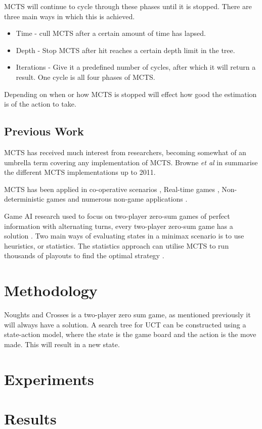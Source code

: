 MCTS will continue to cycle through these phases until it is stopped. There are three main ways in which this is achieved.
\begin{itemize}
  \item Time - cull MCTS after a certain amount of time has lapsed.
  \item Depth - Stop MCTS after hit reaches a certain depth limit in the tree.
  \item Iterations - Give it a predefined number of cycles, after which it will return a result. One cycle is all four phases of MCTS.
\end{itemize}

Depending on when or how MCTS is stopped will effect how good the estimation is of the action to take.

\subsection{Previous Work}
MCTS has received much interest from researchers, becoming somewhat of an umbrella term covering any implementation of MCTS. Browne {\em et al} in \cite{b2} summarise the different MCTS implementations up to 2011.

MCTS has been applied in co-operative scenarios \cite{b3}, Real-time games \cite{b2}, Non-deterministic games \cite{b4} and numerous non-game applications \cite{b2}.

Game AI research used to focus on two-player zero-sum games of perfect information with alternating turns\cite{b2}, every two-player zero-sum game has a solution \cite{b5}. Two main ways of evaluating states in a minimax scenario is to use heuristics, or statistics. The statistics approach can utilise MCTS to run thousands of playouts to find the optimal strategy \cite{b5}.

\section{Methodology}
Noughts and Crosses is a two-player zero sum game, as mentioned previously it will always have a solution. A search tree for UCT can be constructed using a state-action model, where the state is the game board and the action is the move made. This will result in a new state. 

\section{Experiments}
\section{Results}
